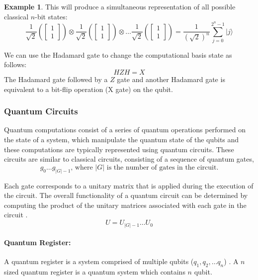 \documentclass[11pt]{article}
\providecommand{\ket}[1]{|#1\rangle}
\theoremstyle{definition}
\newtheorem{exmp}{Example}[section]
\theoremstyle{definition}
\begin{document}
\begin{exmp}
This will produce a simultaneous representation of all possible classical $n$-bit states:
\begin{equation}
\frac{1}{\sqrt{2}}(\begin{bmatrix}1 \\ 1\end{bmatrix}) \otimes
\frac{1}{\sqrt{2}}(\begin{bmatrix}1 \\ 1\end{bmatrix}) \otimes  \ldots
 \frac{1}{\sqrt{2}}(\begin{bmatrix}1 \\ 1\end{bmatrix}) =
 \frac{1}{(\sqrt{2})^n}\sum_{j = 0}^{2^n-1} \ket{j}
 \end{equation}


We can use the Hadamard gate to change the computational basis state as follows:
\begin{equation}
HZH=X
\end{equation}
The Hadamard gate followed by a $Z$ gate and another Hadamard gate is equivalent to a bit-flip operation (X gate) on the qubit.

    \end{exmp}


\subsubsection{Quantum Circuits}
\label{sec:org531fcb9}
Quantum computations consist of a series of quantum operations performed on the
state of a system, which manipulate the quantum state of the qubits and
these computations are typically represented using
quantum circuits. 
These circuits are similar to classical circuits, consisting of a sequence of quantum gates,
\begin{equation}
g_0 \ldots g_{|G|-1} \text{, where } |G| \text{ is the number of gates in the circuit}. 
\end{equation}


Each gate corresponds to a unitary matrix that is applied during the
execution of the circuit. 
The overall functionality of a quantum circuit can be determined by
computing the product of the unitary matrices associated with each gate in
the circuit \cite{nielsen_quantum_2010}.
\begin{equation}
U = U_{|G|-1}\ldots U_0
\end{equation}


\paragraph{Quantum Register:}
\label{sec:orgc053d92}
A quantum register is a system comprised of multiple qubits (\(q_1, q_2,\ldots q_n\)) \cite{kaiser_basic_2001}.
A \(n\) sized quantum register is a quantum system which contains \(n\) qubit.
\end{document}
